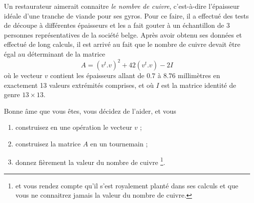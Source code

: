 \begin{exercice}\label{exoMatlab0028}

Un restaurateur aimerait connaitre \emph{le nombre de cuivre}, c'est-à-dire l'épaisseur idéale d'une tranche de viande pour ses gyros. Pour ce faire, il a effectué des tests de découpe à différentes épaisseurs et les a fait gouter à un échantillon de 3 personnes représentatives de la société belge.
Après avoir obtenu ses données et effectué de long calculs, il est arrivé au fait que le nombre de cuivre devait être égal au déterminant de la matrice
\[ A= (v^t.v)^2 + 42(v^t.v) - 2I \]
où le vecteur $v$ contient les épaisseurs allant de $0.7$ à $8.76$ millimètres en exactement 13 valeurs extrémités comprises, et où
$I$ est la matrice identité de genre $13\times 13$.

Bonne âme que vous êtes, vous décidez de l'aider, et vous
\begin{enumerate}
\item construisez en une opération le vecteur $v$ ;
\item construisez la matrice $A$ en un tournemain ;
\item donnez fièrement la valeur du nombre de cuivre \footnote{et vous rendez compte qu'il s'est royalement planté dans ses calculs et que vous ne connaitrez jamais la valeur du nombre de cuivre.}.
\end{enumerate}

\end{exercice}
